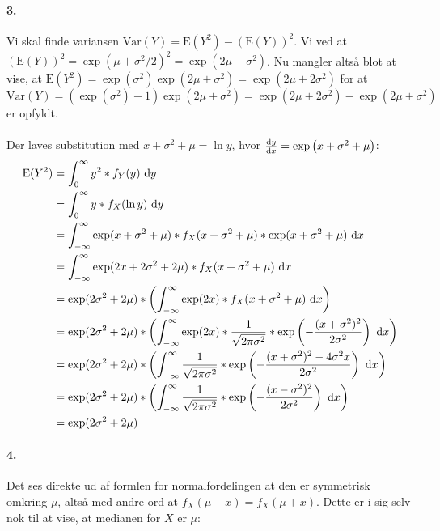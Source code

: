 \paragraph{3.} Vi skal finde variansen $\mathrm{Var}(Y) = \mathrm{E}(Y^2)
- (\mathrm{E}(Y))^2$. Vi ved at $(\mathrm{E}(Y))^2 = \exp(\mu+\sigma^2
/ 2)^2 = \exp(2\mu + \sigma^2)$. Nu mangler altså blot at vise, at
$\mathrm{E}(Y^2)=\exp(\sigma^2)\exp(2\mu+\sigma^2) = \exp(2\mu+ 2\sigma^2)$
for at $\mathrm{Var}(Y) = (\exp(\sigma^2) - 1)\exp(2\mu+\sigma^2) =
\exp(2\mu+2\sigma^2) - \exp(2\mu+\sigma^2)$ er opfyldt.\\
\\
Der laves substitution med $x + \sigma^2 + \mu = \ln y$, hvor
$\frac{\mathrm{d} y}{\mathrm{d} x} = \exp\left(x+\sigma^2 + \mu\right)$:
\begin{align*}
\mathrm{E}(Y^2)
&= \int_0^\infty y^2 * f_Y(y)\ \mathrm{d} y \\
&= \int_0^\infty y * f_X(\ln y)\ \mathrm{d} y \\
&= \int_{-\infty}^\infty
      \exp(x+\sigma^2 + \mu) *
       f_X(x+\sigma^2 + \mu) *
      \exp(x+\sigma^2 + \mu)
   \ \mathrm{d} x \\
&= \int_{-\infty}^\infty
      \exp(2x+2\sigma^2 + 2\mu) *
       f_X(x+\sigma^2 + \mu)
   \ \mathrm{d} x \\
&= \exp(2\sigma^2 + 2\mu) *
   \left(\int_{-\infty}^\infty
      \exp(2x) *
       f_X(x+\sigma^2 + \mu)
   \ \mathrm{d} x\right)\\
&= \exp(2\sigma^2 + 2\mu) *
   \left(\int_{-\infty}^\infty
      \exp(2x) *
      \frac{1}{\sqrt{2\pi\sigma^2}} *
      \exp\left(
        -\frac{(x+\sigma^2)^2}{2\sigma^2}
      \right)
   \ \mathrm{d} x\right)\\
&= \exp(2\sigma^2 + 2\mu) *
   \left(\int_{-\infty}^\infty
      \frac{1}{\sqrt{2\pi\sigma^2}} *
      \exp\left(
        -\frac{(x+\sigma^2)^2 - 4\sigma^2 x}{2\sigma^2}
      \right)
   \ \mathrm{d} x\right) \\
&= \exp(2\sigma^2 + 2\mu) *
   \left(\int_{-\infty}^\infty
      \frac{1}{\sqrt{2\pi\sigma^2}} *
      \exp\left(
        -\frac{(x-\sigma^2)^2}{2\sigma^2}
      \right)
   \ \mathrm{d} x\right) \\
&= \exp(2\sigma^2 + 2\mu)
\end{align*}

\paragraph{4.} Det ses direkte ud af formlen for normalfordelingen at den er
symmetrisk omkring $\mu$, altså med andre ord at $f_X(\mu - x) = f_X(\mu + x)$.
Dette er i sig selv nok til at vise, at medianen for $X$ er $\mu$:

